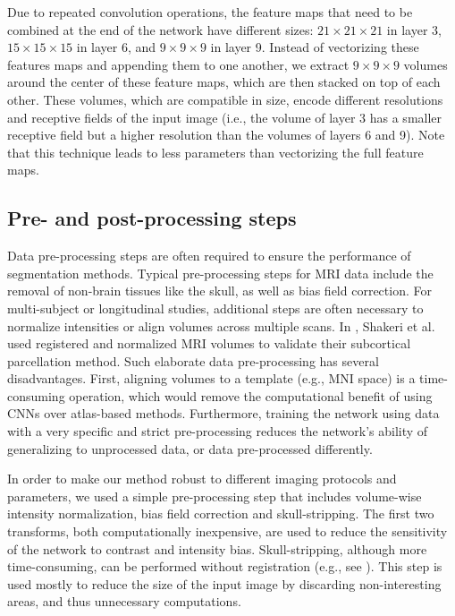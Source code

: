 \documentclass[twoside,fleqn,espcrc2]{elsarticle}
\newcommand{\vold}[1]{$#1\!\times\!#1\!\times\!#1$}
\begin{document}
Due to repeated convolution operations, the feature maps that need to be combined at the end of the network have different sizes: \vold{21} in layer 3, \vold{15} in layer 6, and \vold{9} in layer 9. Instead of vectorizing these features maps and appending them to one another, we extract \vold{9} volumes around the center of these feature maps, which are then stacked on top of each other. These volumes, which are compatible in size, encode different resolutions and receptive fields of the input image (i.e., the volume of layer 3 has a smaller receptive field but a higher resolution than the volumes of layers 6 and 9). Note that this technique leads to less parameters than vectorizing the full feature maps.


\subsection{Pre- and post-processing steps}
\label{ssec:preproc}

Data pre-processing steps are often required to ensure the performance of segmentation methods. Typical pre-processing steps for MRI data include the removal of non-brain tissues like the skull, as well as bias field correction. For multi-subject or longitudinal studies, additional steps are often necessary to normalize intensities or align volumes across multiple scans. In \cite{shakeri2016sub}, Shakeri et al. used registered and normalized MRI volumes to validate their subcortical parcellation method. Such elaborate data pre-processing has several disadvantages. First, aligning volumes to a template (e.g., MNI space) is a time-consuming operation, which would remove the computational benefit of using CNNs over atlas-based methods. Furthermore, training the network using data with a very specific and strict pre-processing reduces the network's ability of generalizing to unprocessed data, or data pre-processed differently.

In order to make our method robust to different imaging protocols and parameters, we used a simple pre-processing step that includes volume-wise intensity normalization, bias field correction and skull-stripping. The first two transforms, both computationally inexpensive, are used to reduce the sensitivity of the network to contrast and intensity bias. Skull-stripping, although more time-consuming, can be performed without registration (e.g., see \cite{smith2002fast}). This step is used mostly to reduce the size of the input image by discarding non-interesting areas, and thus unnecessary computations.
\end{document}
